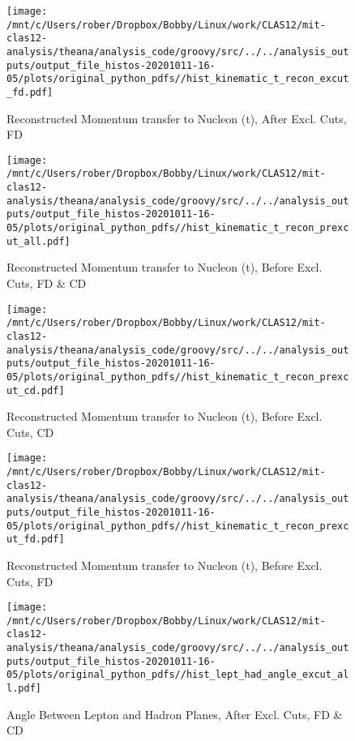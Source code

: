 \documentclass{article}
\begin{document}
\begin{landscape}
\begin{figure}[h]
        \texttt{[image: /mnt/c/Users/rober/Dropbox/Bobby/Linux/work/CLAS12/mit-clas12-analysis/theana/analysis\_code/groovy/src/../../analysis\_outputs/output\_file\_histos-20201011-16-05/plots/original\_python\_pdfs//hist\_kinematic\_t\_recon\_excut\_fd.pdf]}
        \captionsetup{textformat=empty,labelformat=blank}
        \caption{Reconstructed Momentum transfer to Nucleon (t), After Excl. Cuts, FD}
    \end{figure}
    \clearpage
    
    \begin{figure}[h]
        \centering

        \texttt{[image: /mnt/c/Users/rober/Dropbox/Bobby/Linux/work/CLAS12/mit-clas12-analysis/theana/analysis\_code/groovy/src/../../analysis\_outputs/output\_file\_histos-20201011-16-05/plots/original\_python\_pdfs//hist\_kinematic\_t\_recon\_prexcut\_all.pdf]}
        \captionsetup{textformat=empty,labelformat=blank}
        \caption{Reconstructed Momentum transfer to Nucleon (t), Before Excl. Cuts, FD \& CD}
    \end{figure}
    \clearpage
    
    \begin{figure}[h]
        \centering

        \texttt{[image: /mnt/c/Users/rober/Dropbox/Bobby/Linux/work/CLAS12/mit-clas12-analysis/theana/analysis\_code/groovy/src/../../analysis\_outputs/output\_file\_histos-20201011-16-05/plots/original\_python\_pdfs//hist\_kinematic\_t\_recon\_prexcut\_cd.pdf]}
        \captionsetup{textformat=empty,labelformat=blank}
        \caption{Reconstructed Momentum transfer to Nucleon (t), Before Excl. Cuts, CD}
    \end{figure}
    \clearpage
    
    \begin{figure}[h]
        \centering

        \texttt{[image: /mnt/c/Users/rober/Dropbox/Bobby/Linux/work/CLAS12/mit-clas12-analysis/theana/analysis\_code/groovy/src/../../analysis\_outputs/output\_file\_histos-20201011-16-05/plots/original\_python\_pdfs//hist\_kinematic\_t\_recon\_prexcut\_fd.pdf]}
        \captionsetup{textformat=empty,labelformat=blank}
        \caption{Reconstructed Momentum transfer to Nucleon (t), Before Excl. Cuts, FD}
    \end{figure}
    \clearpage
    
    \begin{figure}[h]
        \centering

        \texttt{[image: /mnt/c/Users/rober/Dropbox/Bobby/Linux/work/CLAS12/mit-clas12-analysis/theana/analysis\_code/groovy/src/../../analysis\_outputs/output\_file\_histos-20201011-16-05/plots/original\_python\_pdfs//hist\_lept\_had\_angle\_excut\_all.pdf]}
        \captionsetup{textformat=empty,labelformat=blank}
        \caption{Angle Between Lepton and Hadron Planes, After Excl. Cuts, FD \& CD}
    \end{figure}
    \clearpage
    

\end{landscape}
\end{document}
